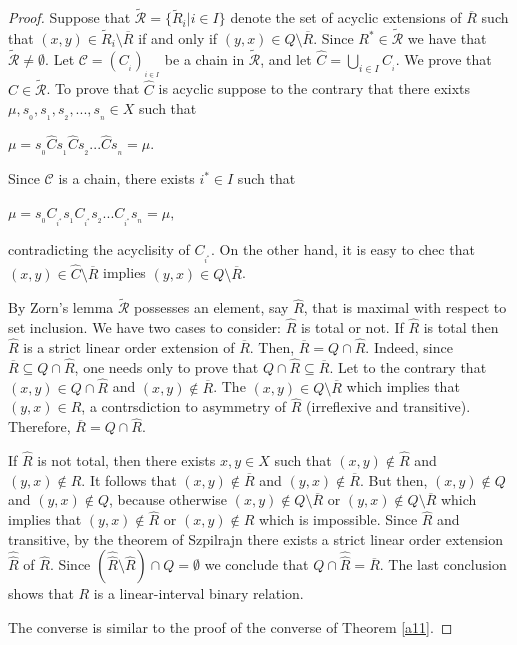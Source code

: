 \documentclass{article}
\theoremstyle{definition}
\begin{document}
\begin{proof}
Suppose that
$\widetilde{{\mathcal{R}}}=\{\widetilde{R}_i\vert i\in I\}$ denote the
set of acyclic extensions of $\overline{R}$ such that 
$(x,y)\in \widetilde{R}_i\setminus \overline{R}$ if and only if $(y,x)\in Q\setminus \overline{R}$.
Since $R^{\ast}\in \widetilde{{\mathcal{R}}}$ we have that $\widetilde{{\mathcal{R}}}\neq \emptyset$.
Let ${{\mathcal{C}}}=(C_{_i})_{_{i\in
I}}$ be a chain in $\widetilde{{\mathcal{R}}}$, and let
$\widehat{C}=\displaystyle\bigcup_{i\in I}C_{_i}$. 
We prove that $\widehat{C}\in \widetilde{{\mathcal{R}}}$.
To prove that $\widehat{C}$ is acyclic suppose to the contrary that
there exixts 
$\mu, s_{_0},s_{_1},s_{_2},...,s_{_n}\in X$ such that
\begin{center}
$\mu=s_{_0}\widehat{C} s_{_1}\widehat{C} s_{_2}...\widehat{C} s_{_n}=\mu.$
\end{center}
Since ${{\mathcal{C}}}$ is a chain, there exists $i^{\ast}\in I$ such that
\begin{center}
$\mu=s_{_0}C_{_{i^{\ast}}} s_{_1}C_{_{i^{\ast}}} s_{_2}...C_{_{i^{\ast}}} s_{_n}=\mu,$
\end{center}
contradicting the acyclisity of $C_{_{i^{\ast}}}$. On the other hand, it is easy to chec that
$(x,y)\in \widehat{C}\setminus \overline{R}$ implies $(y,x)\in Q\setminus \overline{R}$.

By Zorn's lemma $\widetilde{{\mathcal{R}}}$  possesses an
element, say $\widehat{R}$, that is maximal with respect to set
inclusion.
We have two cases to consider:
$\widehat{R}$ is total or not.
If $\widehat{R}$ is total then $\widehat{R}$
is a strict linear order extension of
$\overline{R}$. Then, $\overline{R}=Q\cap \widehat{R}$.
Indeed, since $\overline{R}\subseteq Q\cap \widehat{R}$,
one needs only to prove that $Q\cap \widehat{R}\subseteq \overline{R}$.
Let to the contrary that $(x,y)\in Q\cap \widehat{R}$ and $(x,y)\notin \overline{R}$.
The $(x,y)\in Q\setminus \overline{R}$ which implies that $(y,x)\in \widehat{R}$, 
a contrsdiction to asymmetry of $\widehat{R}$ (irreflexive and transitive).
Therefore, $\overline{R}=Q\cap \widehat{R}$.

If $\widehat{R}$ is not total, then there exists $x, y\in X$ such that $(x,y)\notin \widehat{R}$
and $(y,x)\notin \widehat{R}$. It follows that 
 $(x,y)\notin \overline{R}$
and $(y,x)\notin \overline{R}$. But then, 
 $(x,y)\notin Q$
and $(y,x)\notin Q$, because otherwise  $(x,y)\notin Q\setminus \overline{R}$
or $(y,x)\notin Q\setminus \overline{R}$ which implies that 
$(y,x)\notin \widehat{R}$
or $(x,y)\notin \widehat{R}$ which is impossible.
Since $\widehat{R}$ and transitive, by the theorem of Szpilrajn there exists 
a strict linear order extension $\widehat{\widehat{R}}$ of $\widehat{R}$.
Since $(\widehat{\widehat{R}}\setminus\widehat{R})\cap Q=\emptyset$
we conclude that 
 $Q\cap \widehat{\widehat{R}}=\overline{R}$. The last conclusion shows that
 $R$ is a linear-interval binary relation.


The converse is similar to the proof of the converse of Theorem \ref{a11}.
\end{proof}
\end{document}

